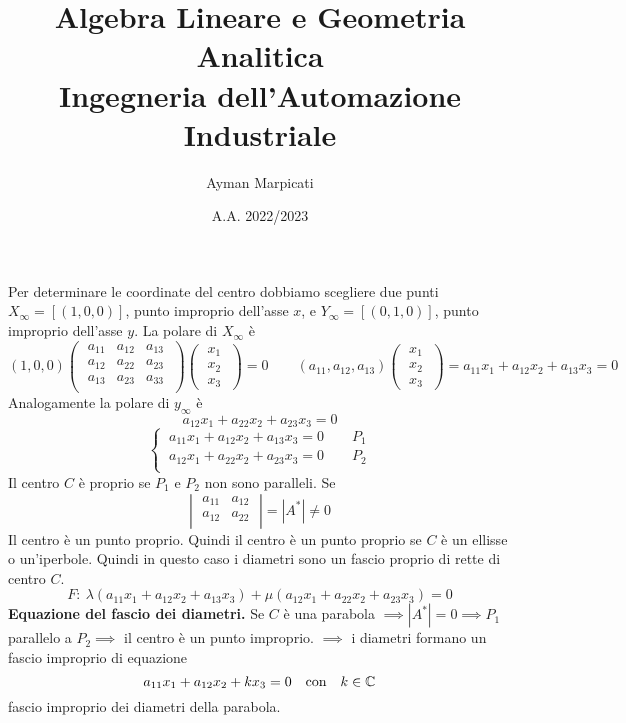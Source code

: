\documentclass{report}
\title{\Huge{Algebra Lineare e Geometria Analitica}\\Ingegneria dell'Automazione Industriale}
\author{\huge{Ayman Marpicati}}
\date{A.A. 2022/2023}
\begin{document}
\maketitle
\newpage%
\tableofcontents





Per determinare le coordinate del centro dobbiamo scegliere due punti \(X_{\infty} = [(1, 0, 0)]\), punto improprio dell'asse \(x\), e \(Y_{\infty} = [(0,1,0)]\), punto improprio dell'asse \(y\). La polare di \(X_{\infty}\) è \[
    (1,0,0)
\left( \; \begin{matrix}
    a_{11} & a_{12} & a_{13} \\
    a_{12} & a_{22} & a_{23} \\
    a_{13} & a_{23} & a_{33} \\
\end{matrix} \; \right)
\left( \; \begin{matrix} x_1 \\ x_2\\ x_3 \end{matrix} \; \right) = 0 \qquad (a_{11}, a_{12}, a_{13}) \left( \; \begin{matrix} x_1 \\ x_2\\ x_3 \end{matrix} \; \right) = a_{11}x_1+a_{12}x_2 + a_{13} x_3 = 0
\] Analogamente la polare di \(y_{\infty}\) è  \[
a_{12}x_1 + a_{22}x_2 + a_{23}x_3 = 0
\] \[
\begin{cases}
    \ a_{11}x_1+a_{12}x_2+a_{13}x_3 = 0 \qquad P_1 \\
    \ a_{12}x_1+a_{22}x_2+a_{23}x_3=0 \qquad P_2 \\
\end{cases}
\] 
Il centro \(C\) è proprio se \(P_1\) e \(P_2\) non sono paralleli. Se \[
\left| \; \begin{matrix}
    a_{11} & a_{12} \\
    a_{12} & a_{22} \\
\end{matrix} \; \right| = |A^{*}| \neq 0
\] Il centro è un punto proprio. Quindi il centro è un punto proprio se \(C\) è un ellisse o un'iperbole. Quindi in questo caso i diametri sono un fascio proprio di rette di centro \(C\). \[
F: \ \lambda (a_{11}x_1+a_{12}x_2+a_{13}x_3) + \mu (a_{12}x_1 + a_{22}x_2 + a_{23}x_3) = 0
\] \textbf{Equazione del fascio dei diametri.} Se \(C\) è una parabola \(\implies |A^{*}| = 0 \implies P_1 \) parallelo a \(P_2 \implies  \) il centro è un punto improprio. \(\implies \) i diametri formano un fascio improprio di equazione \[
a_{11}x_1+a_{12}x_2 + kx_3 = 0 \quad \text{con} \quad k \in \CC
\] fascio improprio dei diametri della parabola.
\end{document}
